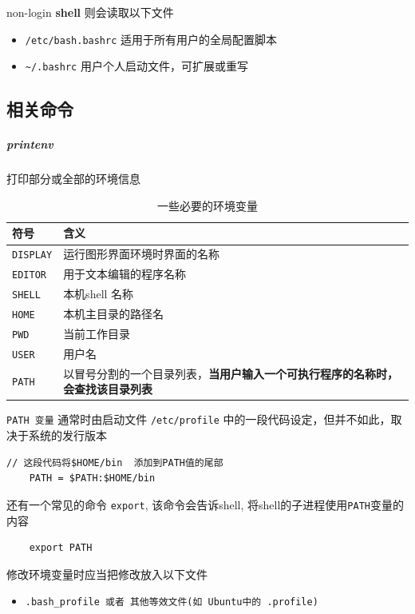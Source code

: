 \documentclass[UTF8,a4paper,12pt]{ctexbook}
\begin{document}
			non-login \textbf{shell} 则会读取以下文件
				\begin{itemize}[itemindent = 1em]
					\item \verb|/etc/bash.bashrc| 适用于所有用户的全局配置脚本
					\item \verb|~/.bashrc| 用户个人启动文件，可扩展或重写
				\end{itemize}
		
		\subsection{相关命令}
		\subparagraph{printenv}打印部分或全部的环境信息
			\begin{table}[H]
				\centering
				\caption{一些必要的环境变量}
				\begin{tabular}{l|m{14cm}}
					\hline
					符号 	   	   & 含义\\
					\hline
					\verb|DISPLAY|		&  运行图形界面环境时界面的名称\\
					\verb|EDITOR|		&  用于文本编辑的程序名称\\
					\verb|SHELL|		&  本机shell 名称\\
					\verb|HOME|		&  本机主目录的路径名\\
					\verb|PWD|		&  当前工作目录\\
					\verb|USER|		&  用户名\\
					\verb|PATH|		&  以冒号分割的一个目录列表，\textbf{当用户输入一个可执行程序的名称时，会查找该目录列表}\\
					\hline
				\end{tabular}
			\end{table}	
			
			\verb|PATH 变量| 通常时由启动文件 \verb|/etc/profile| 中的一段代码设定，但并不如此，取决于系统的发行版本
			\begin{lstlisting}
// 这段代码将$HOME/bin  添加到PATH值的尾部
	PATH = $PATH:$HOME/bin
			\end{lstlisting}
			
			还有一个常见的命令 \verb|export|, 该命令会告诉shell, 将shell的子进程使用\verb|PATH|变量的内容
			\begin{lstlisting}
	export PATH
			\end{lstlisting}
			
			修改环境变量时应当把修改放入以下文件
			\begin{itemize}[itemindent = 1em]
				\item \verb|.bash_profile 或者 其他等效文件(如 Ubuntu中的 .profile)|
			\end{itemize}
			
\end{document}
